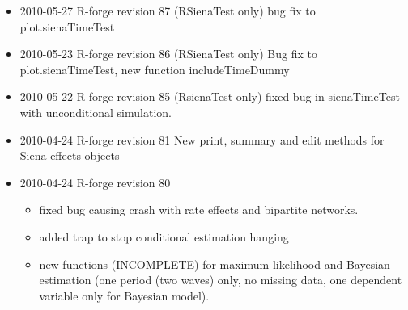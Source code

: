 \documentclass[a4paper,fleqn,11pt]{article}
\newcommand{\+}{\, + \,}
\begin{document}
{\begin{small}
\begin{itemize}
Time dummies for RateX effects
\item 2010-05-27 R-forge revision 87 (RSienaTest only)
bug fix to plot.sienaTimeTest
\item 2010-05-23 R-forge revision 86 (RSienaTest only)
Bug fix to plot.sienaTimeTest, new function includeTimeDummy
\item 2010-05-22 R-forge revision 85 (RsienaTest only) fixed bug in
  sienaTimeTest with unconditional simulation.
\item 2010-04-24 R-forge revision 81
New print, summary and edit methods for Siena effects objects
\item 2010-04-24 R-forge revision 80
\begin{itemize}
\item fixed bug causing crash with rate effects and bipartite networks.
\item added trap to stop conditional estimation hanging
\item new functions (INCOMPLETE) for maximum likelihood and Bayesian estimation
  (one period (two waves) only, no missing data, one dependent variable only for
  Bayesian model).
\end{itemize}


\end{itemize}
\end{small}}
\end{document}
